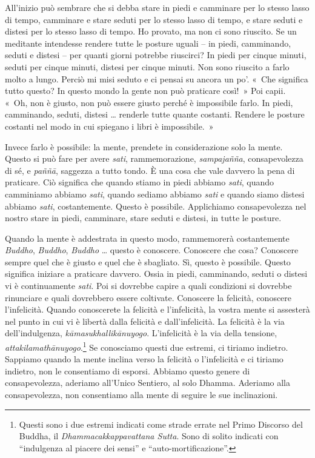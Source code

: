 All'inizio può sembrare che si debba stare in piedi e camminare per lo
stesso lasso di tempo, camminare e stare seduti per lo stesso lasso di
tempo, e stare seduti e distesi per lo stesso lasso di tempo. Ho
provato, ma non ci sono riuscito. Se un meditante intendesse rendere
tutte le posture uguali -- in piedi, camminando, seduti e distesi -- per
quanti giorni potrebbe riuscirci? In piedi per cinque minuti, seduti per
cinque minuti, distesi per cinque minuti. Non sono riuscito a farlo
molto a lungo. Perciò mi misi seduto e ci pensai su ancora un po'. «~Che
significa tutto questo? In questo mondo la gente non può praticare
così!~» Poi capii. «~Oh, non è giusto, non può essere giusto perché è
impossibile farlo. In piedi, camminando, seduti, distesi \ldots{} renderle
tutte quante costanti. Rendere le posture costanti nel modo in cui
spiegano i libri è impossibile.~»

Invece farlo è possibile: la mente, prendete in considerazione solo la
mente. Questo si può fare per avere \emph{sati}, rammemorazione,
\emph{sampajañña}, consapevolezza di sé, e \emph{paññā}, saggezza a
tutto tondo. È una cosa che vale davvero la pena di praticare. Ciò
significa che quando stiamo in piedi abbiamo \emph{sati}, quando
camminiamo abbiamo \emph{sati}, quando sediamo abbiamo \emph{sati} e
quando siamo distesi abbiamo \emph{sati}, costantemente. Questo è
possibile. Applichiamo consapevolezza nel nostro stare in piedi,
camminare, stare seduti e distesi, in tutte le posture.

Quando la mente è addestrata in questo modo, rammemorerà costantemente
\emph{Buddho}, \emph{Buddho}, \emph{Buddho} \ldots{} questo è conoscere.
Conoscere che cosa? Conoscere sempre quel che è giusto e quel che è
sbagliato. Sì, questo è possibile. Questo significa iniziare a praticare
davvero. Ossia in piedi, camminando, seduti o distesi vi è continuamente
\emph{sati}. Poi si dovrebbe capire a quali condizioni si dovrebbe
rinunciare e quali dovrebbero essere coltivate. Conoscere la felicità,
conoscere l'infelicità. Quando conoscerete la felicità e l'infelicità,
la vostra mente si assesterà nel punto in cui vi è libertà dalla
felicità e dall'infelicità. La felicità è la via dell'indulgenza,
\emph{kāmasukhallikānuyogo}. L'infelicità è la via della tensione,
\emph{attakilamathānuyogo}.\footnote{Questi sono i due estremi indicati
  come strade errate nel Primo Discorso del Buddha, il
  \emph{Dhammacakkappavattana Sutta}. Sono di solito indicati con
  ``indulgenza al piacere dei sensi'' e ``auto-mortificazione''.} Se
conosciamo questi due estremi, ci tiriamo indietro. Sappiamo quando la
mente inclina verso la felicità o l'infelicità e ci tiriamo indietro,
non le consentiamo di esporsi. Abbiamo questo genere di consapevolezza,
aderiamo all'Unico Sentiero, al solo Dhamma. Aderiamo alla
consapevolezza, non consentiamo alla mente di seguire le sue
inclinazioni.

